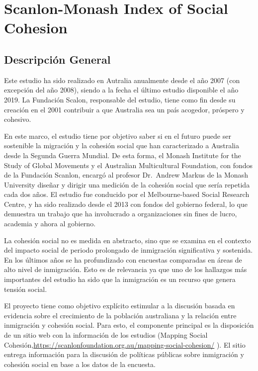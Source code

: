 \documentclass[
  12pt,
]{book}
\begin{document}
\hypertarget{scanlon-monash-index-of-social-cohesion}{%
\chapter{Scanlon-Monash Index of Social Cohesion}\label{scanlon-monash-index-of-social-cohesion}}

\hypertarget{descripciuxf3n-general}{%
\section{Descripción General}\label{descripciuxf3n-general}}

Este estudio ha sido realizado en Autralia anualmente desde el año 2007 (con excepción del año 2008), siendo a la fecha el último estudio disponible el año 2019. La Fundación Scalon, responsable del estudio, tiene como fin desde
su creación en el 2001 contribuir a que Australia sea un país acogedor,
próspero y cohesivo.

En este marco, el estudio tiene por objetivo saber si en el futuro puede
ser sostenible la migración y la cohesión social que han caracterizado a
Australia desde la Segunda Guerra Mundial. De esta forma, el Monash
Institute for the Study of Global Movements y el Australian
Multicultural Foundation, con fondos de la Fundación Scanlon, encargó
al profesor Dr.~Andrew Markus \citep{markus_Attitudinal_2007, markus2013mapping} de la Monash University diseñar y dirigir una
medición de la cohesión social que sería repetida cada dos años. El
estudio fue conducido por el Melbourne-based Social Research Centre, y ha sido realizado desde el 2013 con fondos del gobierno federal, lo que demuestra un trabajo que ha involucrado a organizaciones sin fines de lucro, academia y ahora al
gobierno.

La cohesión social no es medida en abstracto, sino que se examina en el
contexto del impacto social de periodo prolongado de inmigración
significativa y sostenida. En los últimos años se ha profundizado con
encuestas comparadas en áreas de alto nivel de inmigración. Esto es de
relevancia ya que uno de los hallazgos más importantes del estudio ha
sido que la inmigración es un recurso que genera tensión social.

El proyecto tiene como objetivo explícito estimular a la discusión basada en evidencia sobre el crecimiento de la población australiana y la relación entre inmigración y cohesión social. Para esto, el componente principal es la disposición de un sitio web con la información de los estudios (Mapping Social Cohesión,\url{https://scanlonfoundation.org.au/mapping-social-cohesion/} ). El sitio entrega información para la discusión de políticas públicas sobre inmigración y cohesión social en base a los datos de la encuesta.
\end{document}
